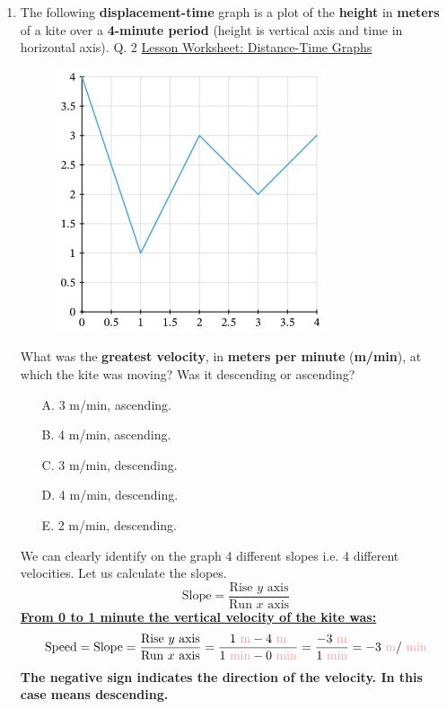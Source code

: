 \documentclass[A4,12pt]{article}
\begin{document}
\begin{enumerate}[label=\bfseries (\arabic*)]
\begin{itemize}
\end{itemize}


















\item The following \textbf{displacement-time} graph is a plot of the \textbf{height} in \textbf{meters} of a kite over a \textbf{4-minute period} (height is vertical axis and time in horizontal axis).  \cite{Nagwa} Q. 2 \href{https://www.nagwa.com/en/worksheets/932192593730/}{Lesson Worksheet: Distance-Time Graphs}
%
\begin{figure}[H]
    \centering
    \includegraphics[scale=0.7]{Nagwa_Q2_kin2.png}
\end{figure}
%
What was the \textbf{greatest velocity}, in \textbf{meters per minute} (\textbf{m/min}), at which the kite was moving? Was it descending or ascending?
%
\begin{itemize}
    \item[A. ] 3 m/min, ascending.
    \item[B. ] 4 m/min, ascending.
    \item[C. ] 3 m/min, descending.
    \item[D. ] 4 m/min, descending.
    \item[E. ] 2 m/min, descending.
\end{itemize}
%
\begin{example}
We can clearly identify on the graph 4 different slopes i.e. 4 different velocities. Let us calculate the slopes.
\begin{equation*}
    \text{Slope}=\frac{\text{Rise $y$ axis}}{\text{Run $x$ axis}}
\end{equation*}
\textbf{\underline{From 0 to 1 minute the vertical velocity of the kite was:}}
\begin{equation*}
    \text{Speed}=\text{Slope}=\frac{\text{Rise $y$ axis}}{\text{Run $x$ axis}}=\frac{\msis{1}-\msis{4}}{\mincgs{1}-\mincgs{0}}=\frac{\msis{-3}}{\mincgs{1}}=-3 \msis{}/\mincgs{}
\end{equation*}
\textbf{The negative sign indicates the direction of the velocity. In this case means descending.}


\end{example}
\end{enumerate}
\end{document}
